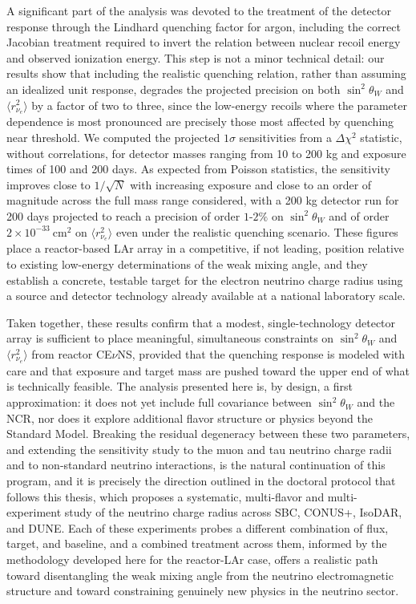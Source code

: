 A significant part of the analysis was devoted to the treatment of the detector response through the Lindhard quenching factor for argon, including the correct Jacobian treatment required to invert the relation between nuclear recoil energy and observed ionization energy. This step is not a minor technical detail: our results show that including the realistic quenching relation, rather than assuming an idealized unit response, degrades the projected precision on both $\sin^2\theta_W$ and $\langle r_{\nu_e}^2\rangle$ by a factor of two to three, since the low-energy recoils where the parameter dependence is most pronounced are precisely those most affected by quenching near threshold. We computed the projected $1\sigma$ sensitivities from a $\Delta\chi^2$ statistic, without correlations, for detector masses ranging from 10 to 200 kg and exposure times of 100 and 200 days. As expected from Poisson statistics, the sensitivity improves close to $1/\sqrt{N}$ with increasing exposure and close to an order of magnitude across the full mass range considered, with a 200 kg detector run for 200 days projected to reach a precision of order $1$-$2\%$ on $\sin^2\theta_W$ and of order $2\times10^{-33}\ \text{cm}^2$ on $\langle r_{\nu_e}^2\rangle$ even under the realistic quenching scenario. These figures place a reactor-based LAr array in a competitive, if not leading, position relative to existing low-energy determinations of the weak mixing angle, and they establish a concrete, testable target for the electron neutrino charge radius using a source and detector technology already available at a national laboratory scale.

Taken together, these results confirm that a modest, single-technology detector array is sufficient to place meaningful, simultaneous constraints on $\sin^2\theta_W$ and $\langle r_{\nu_e}^2\rangle$ from reactor CE$\nu$NS, provided that the quenching response is modeled with care and that exposure and target mass are pushed toward the upper end of what is technically feasible. The analysis presented here is, by design, a first approximation: it does not yet include full covariance between $\sin^2\theta_W$ and the NCR, nor does it explore additional flavor structure or physics beyond the Standard Model. Breaking the residual degeneracy between these two parameters, and extending the sensitivity study to the muon and tau neutrino charge radii and to non-standard neutrino interactions, is the natural continuation of this program, and it is precisely the direction outlined in the doctoral protocol that follows this thesis, which proposes a systematic, multi-flavor and multi-experiment study of the neutrino charge radius across SBC, CONUS+, IsoDAR, and DUNE. Each of these experiments probes a different combination of flux, target, and baseline, and a combined treatment across them, informed by the methodology developed here for the reactor-LAr case, offers a realistic path toward disentangling the weak mixing angle from the neutrino electromagnetic structure and toward constraining genuinely new physics in the neutrino sector.
